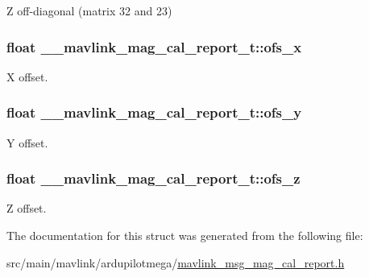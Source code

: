 Z off-\/diagonal (matrix 32 and 23) 

\hypertarget{struct____mavlink__mag__cal__report__t_aac34a98494944b7ecab442403181057d}{
\subsubsection[{ofs\+\_\+x}]{\setlength{\rightskip}{0pt plus 5cm}float \+\_\+\+\_\+mavlink\+\_\+mag\+\_\+cal\+\_\+report\+\_\+t\+::ofs\+\_\+x}}\label{struct____mavlink__mag__cal__report__t_aac34a98494944b7ecab442403181057d}


X offset. 

\hypertarget{struct____mavlink__mag__cal__report__t_aeaeb3dff124d7b06a6e5d2f9ea3333fe}{
\subsubsection[{ofs\+\_\+y}]{\setlength{\rightskip}{0pt plus 5cm}float \+\_\+\+\_\+mavlink\+\_\+mag\+\_\+cal\+\_\+report\+\_\+t\+::ofs\+\_\+y}}\label{struct____mavlink__mag__cal__report__t_aeaeb3dff124d7b06a6e5d2f9ea3333fe}


Y offset. 

\hypertarget{struct____mavlink__mag__cal__report__t_a3cdf756a1f57760dd0fef0c5268feb78}{
\subsubsection[{ofs\+\_\+z}]{\setlength{\rightskip}{0pt plus 5cm}float \+\_\+\+\_\+mavlink\+\_\+mag\+\_\+cal\+\_\+report\+\_\+t\+::ofs\+\_\+z}}\label{struct____mavlink__mag__cal__report__t_a3cdf756a1f57760dd0fef0c5268feb78}


Z offset. 



The documentation for this struct was generated from the following file\+:\begin{DoxyCompactItemize}
\item 
src/main/mavlink/ardupilotmega/\hyperlink{mavlink__msg__mag__cal__report_8h}{mavlink\+\_\+msg\+\_\+mag\+\_\+cal\+\_\+report.\+h}\end{DoxyCompactItemize}
